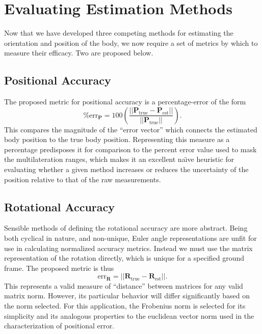\documentclass{report}
\begin{document}
		\section{Evaluating Estimation Methods}
			Now that we have developed three competing methods for estimating the orientation and position of the body, we now require a set of metrics by which to measure their efficacy. Two are proposed below.
			\subsection{Positional Accuracy}
				The proposed metric for positional accuracy is a percentage-error of the form
				\begin{equation}\label{eq:pErr}
					\%\text{err}_{\mathbf{P}}=100\left(\frac{\left|\left|\mathbf{P}_{\text{true}}-\mathbf{P}_{\text{est}}\right|\right|}{\left|\left|\mathbf{P}_{\text{true}}\right|\right|}\right).
				\end{equation}
				This compares the magnitude of the ``error vector'' which connects the estimated body position to the true body position. Representing this measure as a percentage predisposes it for comparison to the percent error value used to mask the multilateration ranges, which makes it an excellent na{\"\i}ve heuristic for evaluating whether a given method increases or reduces the uncertainty of the position relative to that of the raw measurements.

\newpage

			\subsection{Rotational Accuracy}
				Sensible methods of defining the rotational accuracy are more abstract. Being both cyclical in nature, and non-unique, Euler angle representations are unfit for use in calculating normalized accuracy metrics. Instead we must use the matrix representation of the rotation directly, which is unique for a specified ground frame. The proposed metric is thus
				\begin{equation}\label{eq:rErr}
					\text{err}_{\mathbf{R}}=\left|\left|\mathbf{R}_{\text{true}}-\mathbf{R}_{\text{est}}\right|\right|.
				\end{equation}
				This represents a valid measure of ``distance'' between matrices for any valid matrix norm. However, its particular behavior will differ significantly based on the norm selected. For this application, the Frobenius norm is selected for its simplicity and its analogous properties to the euclidean vector norm used in the characterization of positional error.
\end{document}
